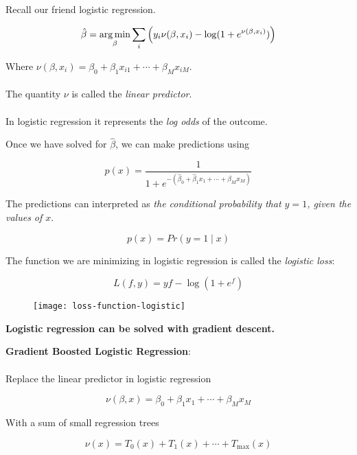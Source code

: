%
\begin{frame}
Recall our friend logistic regression.

$$ \hat \beta = \operatorname*{arg\,min}_{\beta} \sum_i \left( y_i \nu(\beta, x_i) - \log(1 + e^{\nu(\beta, x_i)}) \right) $$

Where $\nu(\beta, x_i) = \beta_0 + \beta_1 x_{i1} + \cdots + \beta_{M} x_{iM}$.\\~\\ 

The quantity $\nu$ is called the \textit{linear predictor}.\\~\\

In logistic regression it represents the \textit{log odds} of the outcome.
\end{frame}
%
\begin{frame}
Once we have solved for $\hat \beta$, we can make predictions using

$$p(x) = \frac{1}{1 + e^{-(\hat \beta_0 + \hat \beta_1 x_1 + \cdots + \hat \beta_M x_M)}}$$

The predictions can interpreted as \textit{the conditional probability that $y = 1$, given the values of $x$}.

$$ p(x) = Pr(y = 1 \mid x) $$
\end{frame}
%
\begin{frame}
The function we are minimizing in logistic regression is called the \textit{logistic loss}:

$$ L(f, y) = y f - \log(1 + e^{f}) $$

  \begin{figure}
    \texttt{[image: loss-function-logistic]}
  \end{figure}
  
\end{frame}
%
\begin{frame}
  \begin{center}
    \textbf{Logistic regression can be solved with gradient descent.}
  \end{center}
\end{frame}
%
\begin{frame}
\textbf{Gradient Boosted Logistic Regression}:\\~\\
Replace the linear predictor in logistic regression 

$$\nu(\beta, x) = \beta_0 + \beta_1 x_1 + \cdots + \beta_{M} x_M$$

With a sum of small regression trees

$$\nu(x) = T_0(x) + T_1(x) + \cdots + T_{\text{max}}(x)$$
\end{frame}

